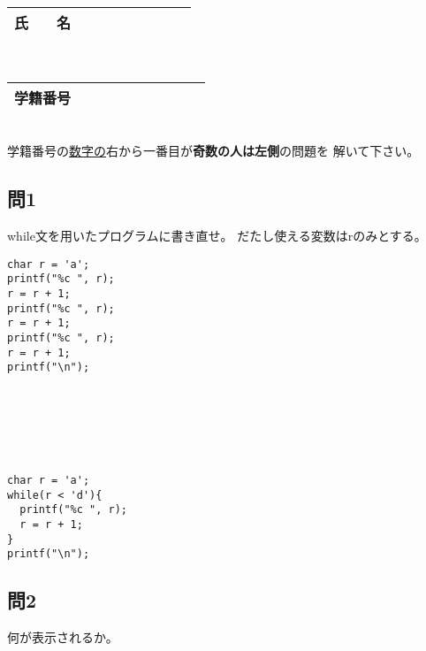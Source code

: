 \documentclass[a4j]{jarticle}
\def\ds{\displaystyle}
\begin{document}
\thispagestyle{empty}

\begin{multicols*}{2}%


\def\subst#1#2{$\ds #1$
 \ $\longrightarrow$\ 
 \underline{\hbox to 5cm{\ttfamily #2}}}



\noindent
\begin{tabular}[t]{|c|cccccccc|}\hline
氏　　名 & & & & & & & & \\ \hline
\end{tabular}\\
\begin{tabular}[t]{|c|c|c|c|c|c|c|c|c|c|}\hline
学籍番号 & & & & & & & & \\ \hline
\end{tabular}\\
学籍番号の\underline{数字の}右から一番目が{\bfseries 奇数の人は左側}の問題を
解いて下さい。
\vspace{-5ex}






\subsection*{問1}

{\ttfamily while}文を用いたプログラムに書き直せ。
だたし使える変数は{\ttfamily r}のみとする。

\begin{verbatim}
char r = 'a';
printf("%c ", r);
r = r + 1;
printf("%c ", r);
r = r + 1;
printf("%c ", r);
r = r + 1;
printf("\n");
\end{verbatim}

\ifnum {}
\begin{verbatim}






\end{verbatim}
\else
\begin{verbatim}
char r = 'a';
while(r < 'd'){
  printf("%c ", r);
  r = r + 1;
}
printf("\n");
\end{verbatim}
\fi
\vspace{6cm}



\subsection*{問2}


何が表示されるか。


\end{multicols*}
\end{document}
